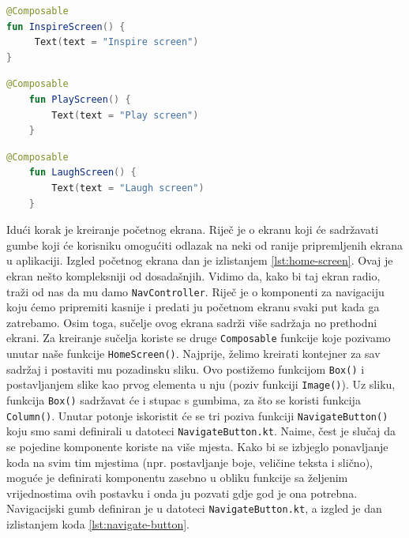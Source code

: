 \documentclass[11pt,a4paper,twoside]{article}
\begin{document}
\begin{lstlisting}[caption={Inspirirajući ekran - InspireScreen.kt}, label={lst:screen-inspire}, language=Kotlin]
@Composable
fun InspireScreen() {
	 Text(text = "Inspire screen")
}
\end{lstlisting}
\begin{lstlisting}[caption={Zaigrani ekran - PlayScreen.kt}, label={lst:screen-play}, language=Kotlin]
	@Composable
	fun PlayScreen() {
		Text(text = "Play screen")
	}
\end{lstlisting}
\begin{lstlisting}[caption={Nasmijani ekran - LaughScreen.kt}, label={lst:screen-laugh}, language=Kotlin]
	@Composable
	fun LaughScreen() {
		Text(text = "Laugh screen")
	}
\end{lstlisting}

Idući korak je kreiranje početnog ekrana. Riječ je o ekranu koji će sadržavati gumbe koji će korisniku omogućiti odlazak na neki od ranije pripremljenih ekrana u aplikaciji. Izgled početnog ekrana dan je izlistanjem \ref{lst:home-screen}. Ovaj je ekran nešto kompleksniji od dosadašnjih. Vidimo da, kako bi taj ekran radio, traži od nas da mu damo \texttt{NavController}. Riječ je o komponenti za navigaciju koju ćemo pripremiti kasnije i predati ju početnom ekranu svaki put kada ga zatrebamo. Osim toga, sučelje ovog ekrana sadrži više sadržaja no prethodni ekrani. Za kreiranje sučelja koriste se druge \texttt{Composable} funkcije koje pozivamo unutar naše funkcije \texttt{HomeScreen()}. Najprije, želimo kreirati kontejner za sav sadržaj i postaviti mu pozadinsku sliku. Ovo postižemo funkcijom \texttt{Box()} i postavljanjem slike kao prvog elementa u nju (poziv funkciji \texttt{Image()}). Uz sliku, funkcija \texttt{Box()} sadržavat će i stupac s gumbima, za što se koristi funkcija \texttt{Column()}. Unutar potonje iskoristit će se tri poziva funkciji \texttt{NavigateButton()} koju smo sami definirali u datoteci \texttt{NavigateButton.kt}. Naime, čest je slučaj da se pojedine komponente koriste na više mjesta. Kako bi se izbjeglo ponavljanje koda na svim tim mjestima (npr. postavljanje boje, veličine teksta i slično), moguće je definirati komponentu zasebno u obliku funkcije sa željenim vrijednostima ovih postavku i onda ju pozvati gdje god je ona potrebna. Navigacijski gumb definiran je u datoteci \texttt{NavigateButton.kt}, a izgled je dan izlistanjem koda \ref{lst:navigate-button}.
\end{document}
